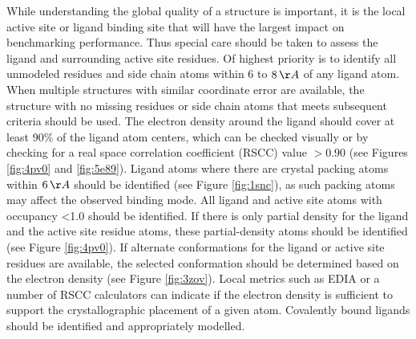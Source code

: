 \documentclass[9pt,bestpractices]{livecoms}
\begin{document}
While understanding the global quality of a structure is important, it is the local active site or ligand binding site that will have the largest impact on benchmarking performance. Thus special care should be taken to assess the ligand and surrounding active site residues. 
%
Of highest priority is to identify all unmodeled residues and side chain atoms within 6 to $8\,\AA$  of any ligand atom. When multiple structures with similar coordinate error are available, the structure with no missing residues or side chain atoms that meets subsequent criteria should be used.
%
The electron density around the ligand should cover at least 90\% of the ligand atom centers, which can be checked visually or by checking for a real space correlation coefficient (RSCC) value $>0.90$ (see Figures \ref{fig:4pv0} and \ref{fig:5e89}). Ligand atoms where there are crystal packing atoms within $6\,\AA$ should be identified (see Figure \ref{fig:1snc}), as such packing atoms may affect the observed binding mode. 
%
All ligand and active site atoms with occupancy <1.0 should be identified.
%
If there is only partial density for the ligand and the active site residue atoms, these partial-density atoms should be identified (see Figure \ref{fig:4pv0}). If alternate conformations for the ligand or active site residues are available, the selected conformation should be determined based on the electron density (see Figure \ref{fig:3zov}). Local metrics such as EDIA or a number of RSCC calculators can indicate if the electron density is sufficient to support the crystallographic placement of a given atom.
%
Covalently bound ligands should be identified and appropriately modelled.
\end{document}
